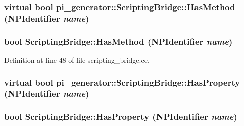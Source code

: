 \hypertarget{classpi__generator_1_1_scripting_bridge_a5da4e0d7d9a2fe59b4838a40503a5a2e}{
\subsubsection[{HasMethod}]{\setlength{\rightskip}{0pt plus 5cm}virtual bool pi\_\-generator::ScriptingBridge::HasMethod (NPIdentifier {\em name})}}
\label{classpi__generator_1_1_scripting_bridge_a5da4e0d7d9a2fe59b4838a40503a5a2e}
\hypertarget{classpi__generator_1_1_scripting_bridge_a1d614bb3696baef7c46332426ab7a0dc}{
\subsubsection[{HasMethod}]{\setlength{\rightskip}{0pt plus 5cm}bool ScriptingBridge::HasMethod (NPIdentifier {\em name})}}
\label{classpi__generator_1_1_scripting_bridge_a1d614bb3696baef7c46332426ab7a0dc}


Definition at line 48 of file scripting\_\-bridge.cc.

\hypertarget{classpi__generator_1_1_scripting_bridge_adbcb9a1bd7516d027a55aabd1ab60cf1}{
\subsubsection[{HasProperty}]{\setlength{\rightskip}{0pt plus 5cm}virtual bool pi\_\-generator::ScriptingBridge::HasProperty (NPIdentifier {\em name})}}
\label{classpi__generator_1_1_scripting_bridge_adbcb9a1bd7516d027a55aabd1ab60cf1}
\hypertarget{classpi__generator_1_1_scripting_bridge_aeed261c756896802f26632acfceba1d7}{
\subsubsection[{HasProperty}]{\setlength{\rightskip}{0pt plus 5cm}bool ScriptingBridge::HasProperty (NPIdentifier {\em name})}}
\label{classpi__generator_1_1_scripting_bridge_aeed261c756896802f26632acfceba1d7}


